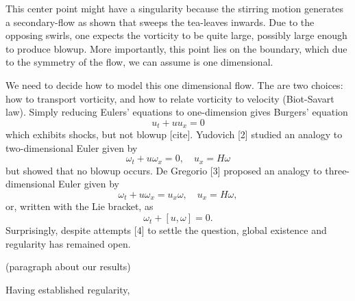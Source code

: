 \documentclass[12pt]{article}
\begin{document}
This center point might have a singularity because the stirring motion generates a secondary-flow as shown that sweeps the tea-leaves inwards. Due to the opposing swirls, one expects the vorticity to be quite large, possibly large enough to produce blowup. More importantly, this point lies on the boundary, which due to the symmetry of the flow, we can assume is one dimensional.

We need to decide how to model this one dimensional flow. The are two choices: how to transport vorticity, and how to relate vorticity to velocity (Biot-Savart law). Simply reducing Eulers' equations to one-dimension gives Burgers' equation
\[
	u_t + u u_x = 0	
\]
which exhibits shocks, but not blowup [cite]. Yudovich [2] studied an analogy to two-dimensional Euler given by
\[
	\omega_t + u \omega_x = 0, \quad u_x = H \omega
\]
but showed that no blowup occurs. De Gregorio [3] proposed an analogy to three-dimensional Euler given by
\[
	\omega_t + u \omega_x = u_x \omega, \quad u_x = H \omega,
\]
or, written with the Lie bracket, as
\[
	\omega_t + [u, \omega] = 0.
\]
Surprisingly, despite attempts [4] to settle the question, global existence and regularity has remained open.

(paragraph about our results)

Having established regularity,
\end{document}
